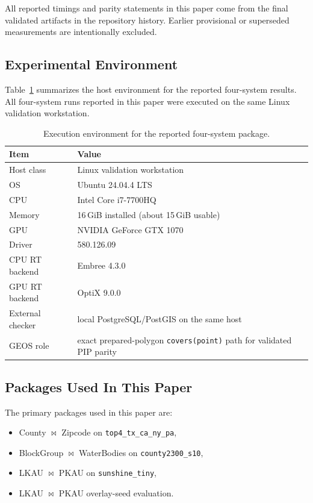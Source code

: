 \documentclass[conference]{IEEEtran}
\begin{document}
All reported timings and parity statements in this paper come from the final
validated artifacts in the repository history. Earlier provisional or
superseded measurements are intentionally excluded.

\subsection{Experimental Environment}

Table~\ref{tab:environment} summarizes the host environment for the reported
four-system results. All four-system runs reported in this paper were executed
on the same Linux validation workstation.

\begin{table}[t]
\caption{Execution environment for the reported four-system package.}
\label{tab:environment}
\centering
\begin{tabular}{p{}p{}}
\toprule
Item & Value \\
\midrule
Host class & Linux validation workstation \\
OS & Ubuntu 24.04.4 LTS \\
CPU & Intel Core i7-7700HQ \\
Memory & 16\,GiB installed (about 15\,GiB usable) \\
GPU & NVIDIA GeForce GTX 1070 \\
Driver & 580.126.09 \\
CPU RT backend & Embree 4.3.0 \\
GPU RT backend & OptiX 9.0.0 \\
External checker & local PostgreSQL/PostGIS on the same host \\
GEOS role & exact prepared-polygon \texttt{covers(point)} path for validated PIP parity \\
\bottomrule
\end{tabular}
\end{table}

\subsection{Packages Used In This Paper}

The primary packages used in this paper are:
\begin{itemize}
\item County $\bowtie$ Zipcode on \texttt{top4\_tx\_ca\_ny\_pa},
\item BlockGroup $\bowtie$ WaterBodies on \texttt{county2300\_s10},
\item LKAU $\bowtie$ PKAU on \texttt{sunshine\_tiny},
\item LKAU $\bowtie$ PKAU overlay-seed evaluation.
\end{itemize}
\end{document}
